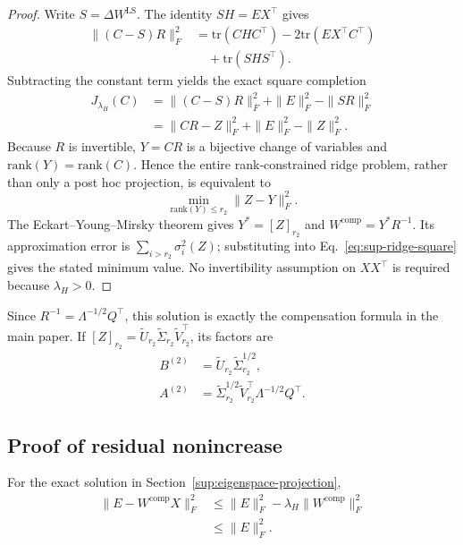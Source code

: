 \begin{proof}
Write $S=\Delta W^{\mathrm{LS}}$. The identity $SH=EX^\top$ gives
\begin{equation}
\begin{aligned}
\|(C-S)R\|_F^2
&=\mathrm{tr}(CHC^\top)-2\mathrm{tr}(EX^\top C^\top) \\
&\quad+\mathrm{tr}(SHS^\top).
\end{aligned}
\end{equation}
Subtracting the constant term yields the exact square completion
\begin{equation}
\begin{aligned}
J_{\lambda_H}(C)
&=\|(C-S)R\|_F^2+\|E\|_F^2-\|SR\|_F^2 \\
&=\|CR-Z\|_F^2+\|E\|_F^2-\|Z\|_F^2.
\end{aligned}
\label{eq:sup-ridge-square}
\end{equation}
Because $R$ is invertible, $Y=CR$ is a bijective change of variables and $\mathrm{rank}(Y)=\mathrm{rank}(C)$. Hence the entire rank-constrained ridge problem, rather than only a post hoc projection, is equivalent to
\begin{equation}
\min_{\mathrm{rank}(Y)\le r_2}\|Z-Y\|_F^2.
\end{equation}
The Eckart--Young--Mirsky theorem gives $Y^*=[Z]_{r_2}$ and $W^{\mathrm{comp}}=Y^*R^{-1}$. Its approximation error is $\sum_{i>r_2}\sigma_i^2(Z)$; substituting into Eq.~\eqref{eq:sup-ridge-square} gives the stated minimum value. No invertibility assumption on $XX^\top$ is required because $\lambda_H>0$.
\end{proof}

Since $R^{-1}=\Lambda^{-1/2}Q^\top$, this solution is exactly the compensation formula in the main paper. If $[Z]_{r_2}=\tilde U_{r_2}\tilde\Sigma_{r_2}\tilde V_{r_2}^\top$, its factors are
\begin{equation}
\begin{aligned}
B^{(2)}&=\tilde U_{r_2}\tilde\Sigma_{r_2}^{1/2}, \\
A^{(2)}&=\tilde\Sigma_{r_2}^{1/2}\tilde V_{r_2}^\top\Lambda^{-1/2}Q^\top.
\end{aligned}
\end{equation}

\subsection{Proof of residual nonincrease}\label{sup:proof-lemma1}

\begin{lemma*}
For the exact solution in Section~\ref{sup:eigenspace-projection},
\begin{equation}
\begin{aligned}
\|E-W^{\mathrm{comp}}X\|_F^2
&\le\|E\|_F^2-\lambda_H\|W^{\mathrm{comp}}\|_F^2 \\
&\le\|E\|_F^2.
\end{aligned}
\end{equation}
\end{lemma*}

